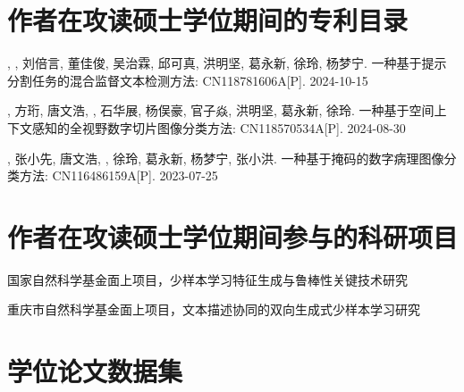 \section[\hspace{-2pt}作者在攻读硕士学位期间的专利目录]{{\heiti{} \hspace{-8pt}作者在攻读硕士学位期间的专利目录}}
{
\small
\setlength{\baselineskip}{20pt}
\begin{enumerate}[label={[\arabic*]}, leftmargin=*]
\item {}, , 刘倍言, 董佳俊, 吴治霖, 邱可真, 洪明坚, 葛永新, 徐玲, 杨梦宁. 一种基于提示分割任务的混合监督文本检测方法: CN118781606A[P]. 2024-10-15
\item {}, 方珩, 唐文浩, , 石华展, 杨俣豪, 官子焱, 洪明坚, 葛永新, 徐玲. 一种基于空间上下文感知的全视野数字切片图像分类方法: CN118570534A[P]. 2024-08-30
\item {},  张小先, 唐文浩, , 徐玲, 葛永新, 杨梦宁, 张小洪. 一种基于掩码的数字病理图像分类方法: CN116486159A[P]. 2023-07-25
\end{enumerate}
}

\section[\hspace{-2pt}作者在攻读硕士学位期间参与的科研项目]{{\heiti{} \hspace{-8pt}作者在攻读硕士学位期间参与的科研项目}}

{
\small
\setlength{\baselineskip}{20pt}
\begin{enumerate}[label={[\arabic*]}, leftmargin=*]
\item 国家自然科学基金面上项目，少样本学习特征生成与鲁棒性关键技术研究
\item 重庆市自然科学基金面上项目，文本描述协同的双向生成式少样本学习研究
\end{enumerate}
}

\newpage
\section[\hspace{-2pt}学位论文数据集]{{\heiti{} \hspace{-8pt}学位论文数据集}}

